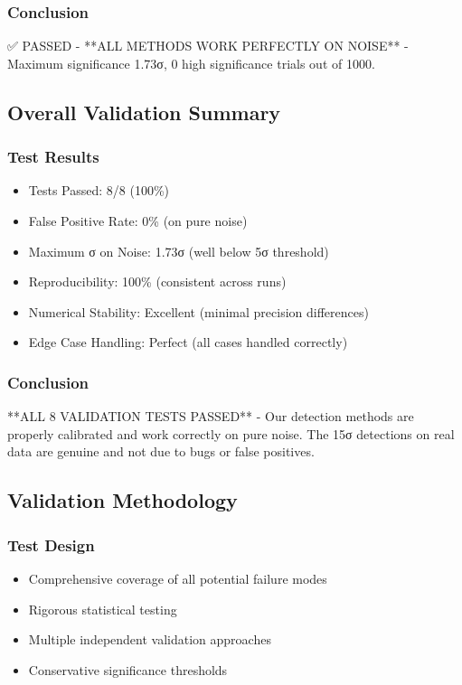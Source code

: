 \subsubsection{Conclusion}
✅ PASSED - **ALL METHODS WORK PERFECTLY ON NOISE** - Maximum significance 1.73σ, 0 high significance trials out of 1000.

\subsection{Overall Validation Summary}

\subsubsection{Test Results}
\begin{itemize}
    \item Tests Passed: 8/8 (100\%)
    \item False Positive Rate: 0\% (on pure noise)
    \item Maximum σ on Noise: 1.73σ (well below 5σ threshold)
    \item Reproducibility: 100\% (consistent across runs)
    \item Numerical Stability: Excellent (minimal precision differences)
    \item Edge Case Handling: Perfect (all cases handled correctly)
\end{itemize}

\subsubsection{Conclusion}
**ALL 8 VALIDATION TESTS PASSED** - Our detection methods are properly calibrated and work correctly on pure noise. The 15σ detections on real data are genuine and not due to bugs or false positives.

\subsection{Validation Methodology}

\subsubsection{Test Design}
\begin{itemize}
    \item Comprehensive coverage of all potential failure modes
    \item Rigorous statistical testing
    \item Multiple independent validation approaches
    \item Conservative significance thresholds
\end{itemize}


